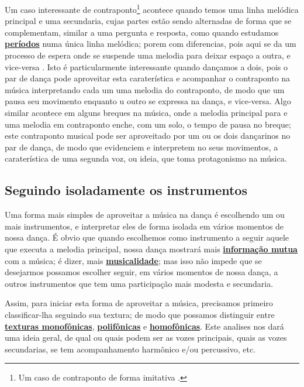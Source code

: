 Um caso interessante de contraponto\footnote{Um 
caso de contraponto de forma imitativa \cite[pp. 100]{tragtenberg2002contraponto}.}
acontece quando temos uma linha melódica principal e uma secundaria, 
cujas partes estão sendo alternadas de forma que se complementam,
similar a uma pergunta e resposta, como quando estudamos 
\hyperref[sec:Periodo]{\textbf{períodos}} numa única linha melódica;
porem com diferencias, pois aqui se da um processo de espera onde se suspende 
uma melodia para deixar espaço 
a outra, e vice-versa \cite[pp. 100, 111]{tragtenberg2002contraponto}.
Isto é particularmente interessante quando dançamos a dois,
pois o par de dança pode aproveitar esta caraterística 
e acompanhar o contraponto na música interpretando cada um 
uma melodia do contraponto, 
de modo que um pausa seu movimento enquanto u outro se expressa na dança, e vice-versa.
Algo similar acontece em alguns breques na música, onde a melodia principal para 
e uma melodia em contraponto enche, com um solo, o tempo de pausa no breque;
este contraponto musical pode ser aproveitado por um ou os dois dançarinos no par de dança,
de modo que evidenciem e interpretem no seus movimentos, 
a caraterística de uma segunda voz, ou ideia, que toma protagonismo na música.

\subsection{Seguindo isoladamente os instrumentos}
\label{sec:seguindoinstrumentos}
Uma forma mais simples de aproveitar a música na dança é escolhendo um ou mais instrumentos,
e interpretar eles de forma isolada em vários momentos de nossa dança. 
É obvio que quando escolhemos como instrumento a seguir aquele que executa a melodia principal,
nossa dança mostrará mais \hyperref[sec:musicalidadeinfmutua]{\textbf{informação mutua}} com a música; é dizer, 
mais \hyperref[sec:musicalidadeinfmutua]{\textbf{musicalidade}};
mas isso não impede que se desejarmos possamos escolher  
seguir, em vários momentos de nossa dança,
a outros instrumentos que tem uma participação mais modesta e secundaria.

Assim, para iniciar esta forma de aproveitar a música, precisamos primeiro 
classificar-lha seguindo sua textura;
de modo que possamos distinguir entre
\hyperref[subsec:monofonica]{\textbf{texturas monofônicas}}, 
\hyperref[subsec:polifonica]{\textbf{polifônicas}} e
\hyperref[subsec:homofonica]{\textbf{homofônicas}}. 
Este analises nos dará uma ideia geral, 
de qual ou quais podem ser as vozes principais, quais as vozes secundarias,
se tem acompanhamento harmônico e/ou percussivo, etc.

